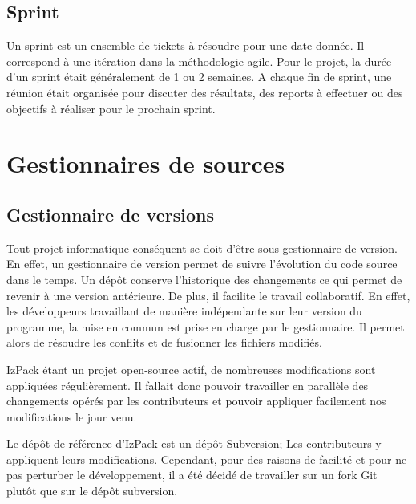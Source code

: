 \subsection{Sprint}
Un sprint est un ensemble de tickets à résoudre pour une date donnée.
Il correspond à une itération dans la méthodologie agile.
Pour le projet, la durée d'un sprint était généralement de 1 ou 2 semaines.
A chaque fin de sprint, une réunion était organisée pour discuter des résultats, des reports à effectuer ou des objectifs à réaliser pour le prochain sprint.

\section{Gestionnaires de sources}
\subsection{Gestionnaire de versions}
Tout projet informatique conséquent se doit d'être sous gestionnaire de version.
En effet, un gestionnaire de version permet de suivre l'évolution du code source dans le temps.
Un dépôt conserve l'historique des changements ce qui permet de revenir à une version antérieure.
De plus, il facilite le travail collaboratif.
En effet, les développeurs travaillant de manière indépendante sur leur version du programme, la mise en commun est prise en charge par le gestionnaire.
Il permet alors de résoudre les conflits et de fusionner les fichiers modifiés.

IzPack étant un projet open-source actif, de nombreuses modifications sont appliquées régulièrement.
Il fallait donc pouvoir travailler en parallèle des changements opérés par les contributeurs et pouvoir appliquer facilement nos modifications le jour venu.

Le dépôt de référence d'IzPack est un dépôt Subversion; Les contributeurs y appliquent leurs modifications.
Cependant, pour des raisons de facilité et pour ne pas perturber le développement, il a été décidé de travailler sur un fork Git plutôt que sur le dépôt subversion.

